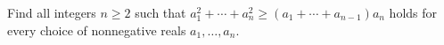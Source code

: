 Find all integers $ n\ge2 $ such that $ a_1^2+\cdots+a_n^2\ge(a_1+\cdots+a_{n-1})a_n $ holds for every choice of nonnegative reals $ a_1,\ldots,a_n $.
